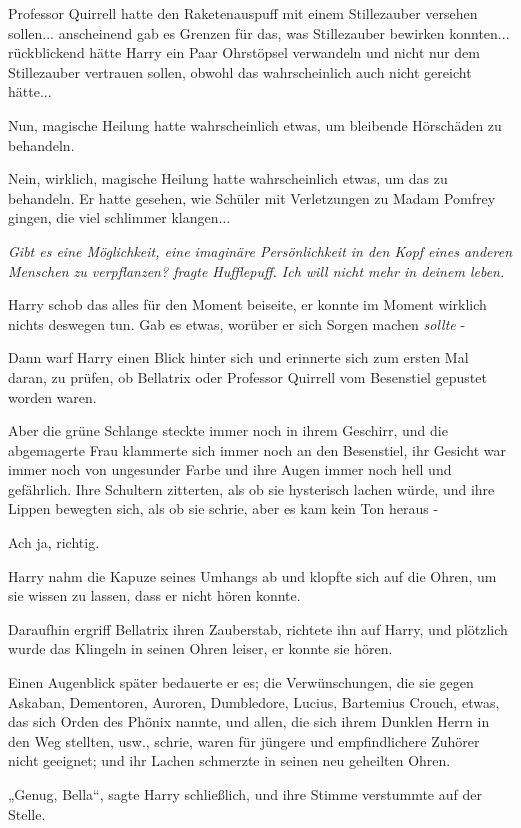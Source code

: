 {Professor Quirrell hatte den Raketenauspuff mit einem Stillezauber versehen sollen... anscheinend gab es Grenzen für das, was Stillezauber bewirken konnten... rückblickend hätte Harry ein Paar Ohrstöpsel verwandeln und nicht nur dem Stillezauber vertrauen sollen, obwohl das wahrscheinlich auch nicht gereicht hätte...

Nun, magische Heilung hatte wahrscheinlich etwas, um bleibende Hörschäden zu behandeln.

Nein, wirklich, magische Heilung hatte wahrscheinlich etwas, um das zu behandeln. Er hatte gesehen, wie Schüler mit Verletzungen zu Madam Pomfrey gingen, die viel schlimmer klangen...

\emph{\emph{Gibt es eine Möglichkeit, eine imaginäre Persönlichkeit in den Kopf eines anderen Menschen zu verpflanzen?} fragte Hufflepuff. \emph{Ich will nicht mehr in deinem leben.}}

Harry schob das alles für den Moment beiseite, er konnte im Moment wirklich nichts deswegen tun. Gab es etwas, worüber er sich Sorgen machen \emph{sollte} -

Dann warf Harry einen Blick hinter sich und erinnerte sich zum ersten Mal daran, zu prüfen, ob Bellatrix oder Professor Quirrell vom Besenstiel gepustet worden waren.

Aber die grüne Schlange steckte immer noch in ihrem Geschirr, und die abgemagerte Frau klammerte sich immer noch an den Besenstiel, ihr Gesicht war immer noch von ungesunder Farbe und ihre Augen immer noch hell und gefährlich. Ihre Schultern zitterten, als ob sie hysterisch lachen würde, und ihre Lippen bewegten sich, als ob sie schrie, aber es kam kein Ton heraus -

Ach ja, richtig.

Harry nahm die Kapuze seines Umhangs ab und klopfte sich auf die Ohren, um sie wissen zu lassen, dass er nicht hören konnte.

Daraufhin ergriff Bellatrix ihren Zauberstab, richtete ihn auf Harry, und plötzlich wurde das Klingeln in seinen Ohren leiser, er konnte sie hören.

Einen Augenblick später bedauerte er es; die Verwünschungen, die sie gegen Askaban, Dementoren, Auroren, Dumbledore, Lucius, Bartemius Crouch, etwas, das sich Orden des Phönix nannte, und allen, die sich ihrem Dunklen Herrn in den Weg stellten, usw., schrie, waren für jüngere und empfindlichere Zuhörer nicht geeignet; und ihr Lachen schmerzte in seinen neu geheilten Ohren.

„Genug, Bella“, sagte Harry schließlich, und ihre Stimme verstummte auf der Stelle.

}

